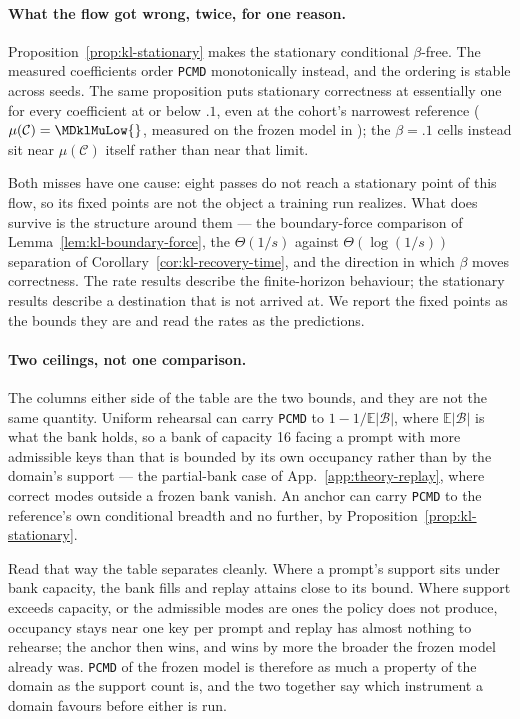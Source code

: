 \documentclass{article}
\newcommand{\1}{\mathbf 1}
\newcommand{\E}{\mathbb E}
\newcommand{\pmd}{\texttt{PCMD}}
\theoremstyle{remark}
\theoremstyle{definition}
\theoremstyle{plain}
\begin{document}
\paragraph{What the flow got wrong, twice, for one reason.}
Proposition~\ref{prop:kl-stationary} makes the stationary conditional
$\beta$-free. The measured coefficients order \pmd{} monotonically instead, and
the ordering is stable across seeds. The same proposition puts stationary
correctness at essentially one for every coefficient at or below $.1$, even at
the cohort's narrowest reference ($\mu(\mathcal C)=\MDklMuLow{}$, measured on
the frozen model in \MDklMuLowDomain{}); the $\beta=.1$ cells instead sit near
$\mu(\mathcal C)$ itself rather than near that limit.

Both misses have one cause: eight passes do not reach a stationary point of
this flow, so its fixed points are not the object a training run realizes. What
does survive is the structure around them --- the boundary-force comparison of
Lemma~\ref{lem:kl-boundary-force}, the $\Theta(1/s)$ against
$\Theta(\log(1/s))$ separation of Corollary~\ref{cor:kl-recovery-time}, and the
direction in which $\beta$ moves correctness. The rate results describe the
finite-horizon behaviour; the stationary results describe a destination that is
not arrived at. We report the fixed points as the bounds they are and read the
rates as the predictions.

\paragraph{Two ceilings, not one comparison.}
The columns either side of the table are the two bounds, and they are not the
same quantity. Uniform rehearsal can carry \pmd{} to $1-1/\E|\mathcal B|$,
where $\E|\mathcal B|$ is what the bank holds, so a bank of capacity 16 facing
a prompt with more admissible keys than that is bounded by its own occupancy
rather than by the domain's support --- the partial-bank case of
App.~\ref{app:theory-replay}, where correct modes outside a frozen bank vanish.
An anchor can carry \pmd{} to the reference's own conditional breadth and no
further, by Proposition~\ref{prop:kl-stationary}.

Read that way the table separates cleanly. Where a prompt's support sits under
bank capacity, the bank fills and replay attains close to its bound. Where
support exceeds capacity, or the admissible modes are ones the policy does not
produce, occupancy stays near one key per prompt and replay has almost nothing
to rehearse; the anchor then wins, and wins by more the broader the frozen
model already was. \pmd{} of the frozen model is therefore as much a property
of the domain as the support count is, and the two together say which
instrument a domain favours before either is run.
\end{document}

